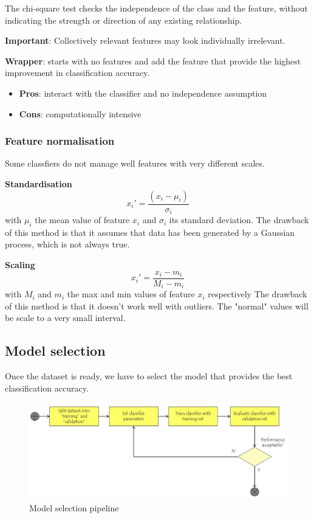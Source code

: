 The chi-square test checks the independence of the class and the feature, without indicating the strength or direction of any existing relationship.

\textbf{Important}: Collectively relevant features may look individually irrelevant.

\textbf{Wrapper}: starts with no features and add the feature that provide the highest improvement in classification accuracy.
\begin{itemize}
	\item \textbf{Pros}: interact with the classifier and no independence assumption
	\item \textbf{Cons}: computationally intensive
\end{itemize}

\subsubsection*{Feature normalisation}
Some classfiers do not manage well features with very different scales.

\textbf{Standardisation}
\[
	x_i' = \frac{(x_i - \mu_i)}{\sigma_i}
\]
with $\mu_i$ the mean value of feature $x_i$ and $\sigma_i$ its standard deviation.
The drawback of this method is that it assumes that data has been generated by a Gaussian process, which is not always true.

\textbf{Scaling}
\[
	x_i' = \frac{x_i - m_i}{M_i - m_i}
\]
with $M_i$ and $m_i$ the max and min values of feature $x_i$ respectively
The drawback of this method is that it doesn't work well with outliers. The "normal" values will be scale to a very small interval.

\subsection{Model selection}
Once the dataset is ready, we have to select the model that provides the best classification accuracy. 

\begin{figure}[!ht]
  \centering
  \includegraphics[width=1.0\linewidth]{figures/model_selection}
  \caption{Model selection pipeline}
  \label{fig:modelSelection}
\end{figure}

